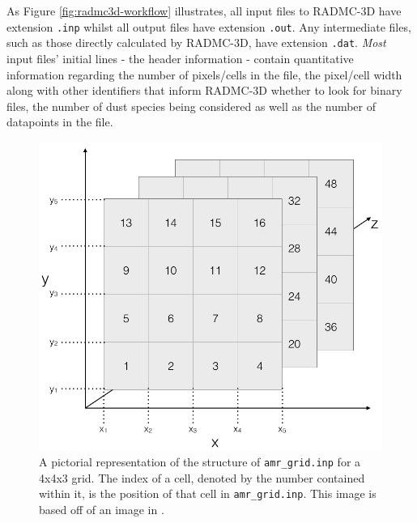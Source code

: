 \documentclass{report}
\begin{document}
As Figure \ref{fig:radmc3d-workflow} illustrates, all input files to RADMC-3D have extension \texttt{.inp} whilst all output files have extension \texttt{.out}. Any intermediate files, such as those directly calculated by RADMC-3D, have extension \texttt{.dat}. \textit{Most} input files' initial lines - the header information - contain quantitative information regarding the number of pixels/cells in the file, the pixel/cell width along with other identifiers that inform RADMC-3D whether to look for binary files, the number of dust species being considered as well as the number of datapoints in the file.

\begin{figure}
  \centering
  \includegraphics[scale=0.3]{../img/amr_grid_structure}
  \caption[A pictorial representation of the structure of \texttt{amr\_grid.inp} for a 4x4x3 grid. The index of a cell, denoted by the number contained within it, is the position of that cell in \texttt{amr\_grid.inp}. This image is based off of an image in \textcite{manual}.]{A pictorial representation of the structure of \texttt{amr\_grid.inp} for a 4x4x3 grid. The index of a cell, denoted by the number contained within it, is the position of that cell in \texttt{amr\_grid.inp}. This image is based off of an image in \textcite{manual}.}
\end{figure}\label{fig:amr_grid_structure}
\end{document}
